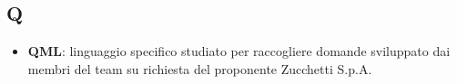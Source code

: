 \subsection{Q}
\begin{itemize}
	\item
	\textbf{QML}: linguaggio specifico studiato per raccogliere domande sviluppato dai membri del team \gruppo su richiesta del proponente Zucchetti S.p.A.	
\end{itemize}